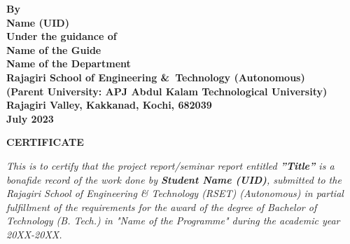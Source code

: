 \begin{center}
		\large \bfseries{By}\\[.2cm]
		\large \bfseries{ Name (UID) }\\[0.6cm]
		\large \bfseries{Under the guidance of}\\[0.5cm]
		\large \bfseries{Name of the Guide}\\[0.75cm]
		\large \textbf{Name of the Department}\\
		\large \textbf{Rajagiri School of Engineering \&\ Technology (Autonomous)}\\
		\small \bfseries{(Parent University: APJ Abdul Kalam Technological University)}\\
		\large \textbf{Rajagiri Valley, Kakkanad, Kochi, 682039}\\
		\large \bfseries{July 2023}
	\end{center}
	
	\newpage
	\thispagestyle{empty}
	\vspace{1cm}
	\begin{center}
	
		\large \bfseries{\huge{CERTIFICATE}}\\[1cm]
	\end{center}
	
	\renewcommand{\baselinestretch}{1.2}\normalsize
	
	\emph{This is to certify that the project report/seminar report entitled \textbf{”Title”} is a bonafide record of the work done by \textbf{Student Name (UID)}, submitted to the Rajagiri School of Engineering \& Technology (RSET) (Autonomous) in 
		partial fulfillment of the requirements for the award of the degree of Bachelor of Technology (B. Tech.) in "Name of the Programme" during the academic year 20XX-20XX.}\\[2.5cm]
	
